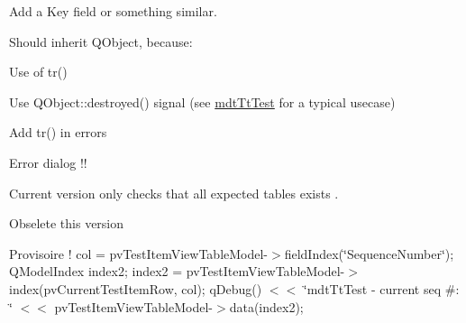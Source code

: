 \begin{DoxyRefList}
\item[\label{todo__todo000063}%
\hypertarget{todo__todo000063}{}%
Member \hyperlink{classmdt_tt_abstract_test_node_calibration_tool_a85c47fe2b501769f5966a27aeb3f051a}{mdt\-Tt\-Abstract\-Test\-Node\-Calibration\-Tool\-:\-:set\-Test\-Node} (const Q\-Variant \&test\-Node\-Id)]Add a Key field or something similar.  
\item[\label{todo__todo000065}%
\hypertarget{todo__todo000065}{}%
Class \hyperlink{classmdt_tt_base}{mdt\-Tt\-Base} ]Should inherit Q\-Object, because\-:
\begin{DoxyItemize}
\item Use of tr()
\item Use Q\-Object\-::destroyed() signal (see \hyperlink{classmdt_tt_test}{mdt\-Tt\-Test} for a typical usecase)  
\end{DoxyItemize}
\item[\label{todo__todo000064}%
\hypertarget{todo__todo000064}{}%
Member \hyperlink{classmdt_tt_base_a6dbd221d1518e30c3692a7ba54b57c03}{mdt\-Tt\-Base\-:\-:mdt\-Tt\-Base} (Q\-Object $\ast$parent, Q\-Sql\-Database db)]Add tr() in errors  
\item[\label{todo__todo000066}%
\hypertarget{todo__todo000066}{}%
Member \hyperlink{classmdt_tt_basic_tester_window_a55ed2ee382f4d560e5c5e055e69b7a6d}{mdt\-Tt\-Basic\-Tester\-Window\-:\-:init} ()]Error dialog !!  
\item[\label{todo__todo000068}%
\hypertarget{todo__todo000068}{}%
Member \hyperlink{classmdt_tt_database_schema_ace92b340a68ce07ad477502a68de4514}{mdt\-Tt\-Database\-Schema\-:\-:check\-Schema} ()]Current version only checks that all expected tables exists . 
\item[\label{todo__todo000080}%
\hypertarget{todo__todo000080}{}%
Member \hyperlink{classmdt_tt_logical_test_cable_a5abe6257d4ca126550b9ca9fb31a1ebc}{mdt\-Tt\-Logical\-Test\-Cable\-:\-:add\-Link} (const Q\-Variant \&test\-Connection\-Id, const Q\-Variant \&dut\-Connection\-Id, const Q\-Variant \&test\-Cable\-Id, const Q\-Variant \&identification, const Q\-Variant \&value)]Obselete this version  
\item[\label{todo__todo000082}%
\hypertarget{todo__todo000082}{}%
Member \hyperlink{classmdt_tt_test_a71e868fa2c182b33982276e52f9c4d23}{mdt\-Tt\-Test\-:\-:get\-Setup\-Data} (const Q\-Variant \&test\-Model\-Item\-Id, bool \&ok)]Provisoire ! col = pv\-Test\-Item\-View\-Table\-Model-\/$>$field\-Index(\char`\"{}\-Sequence\-Number\char`\"{}); Q\-Model\-Index index2; index2 = pv\-Test\-Item\-View\-Table\-Model-\/$>$index(pv\-Current\-Test\-Item\-Row, col); q\-Debug() $<$$<$ \char`\"{}mdt\-Tt\-Test -\/ current seq \#\-: \char`\"{} $<$$<$ pv\-Test\-Item\-View\-Table\-Model-\/$>$data(index2); 

\end{DoxyRefList}
